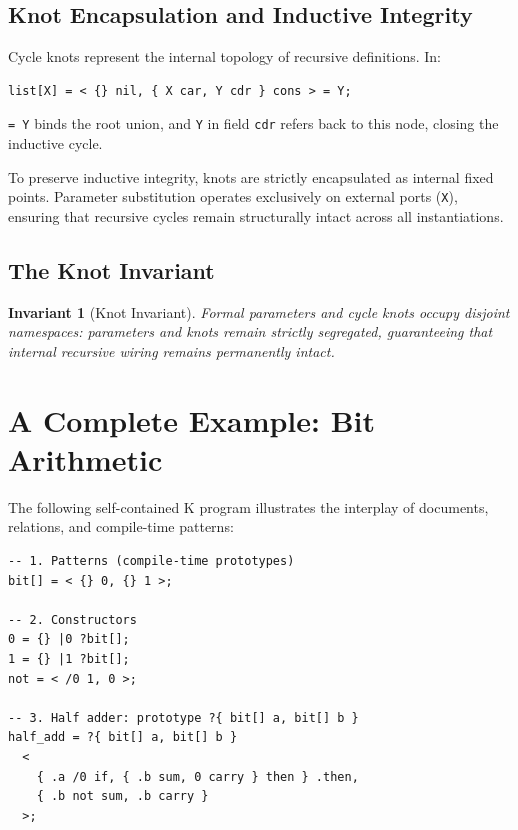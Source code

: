 \documentclass[11pt,a4paper]{article}
\newtheorem{invariant}[theorem]{Invariant}
\begin{document}
\subsection{Knot Encapsulation and Inductive Integrity}

Cycle knots represent the internal topology of recursive definitions. In:
\begin{lstlisting}[language=k]
list[X] = < {} nil, { X car, Y cdr } cons > = Y;
\end{lstlisting}
\lstinline|= Y| binds the root union, and \lstinline|Y| in field \lstinline|cdr| refers back to this node, closing the inductive cycle.

To preserve inductive integrity, knots are strictly encapsulated as internal fixed points. Parameter substitution operates exclusively on external ports (\lstinline|X|), ensuring that recursive cycles remain structurally intact across all instantiations.

\subsection{The Knot Invariant}

\begin{invariant}[Knot Invariant]
Formal parameters and cycle knots occupy disjoint namespaces: parameters and knots remain strictly segregated, guaranteeing that internal recursive wiring remains permanently intact.
\end{invariant}

\section{A Complete Example: Bit Arithmetic}

The following self-contained K program illustrates the interplay of documents, relations, and compile-time patterns:

\begin{lstlisting}[language=k]
-- 1. Patterns (compile-time prototypes)
bit[] = < {} 0, {} 1 >;

-- 2. Constructors
0 = {} |0 ?bit[];
1 = {} |1 ?bit[];
not = < /0 1, 0 >;

-- 3. Half adder: prototype ?{ bit[] a, bit[] b }
half_add = ?{ bit[] a, bit[] b }
  < 
    { .a /0 if, { .b sum, 0 carry } then } .then,
    { .b not sum, .b carry }
  >;
\end{lstlisting}
\end{document}
